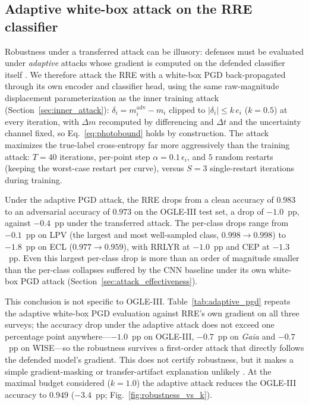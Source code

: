 \documentclass{aa}
\begin{document}
\subsection{Adaptive white-box attack on the RRE classifier}
\label{sec:adaptive_attack}


Robustness under a transferred attack can be illusory: defenses must be
evaluated under \emph{adaptive} attacks whose gradient is computed on the
defended classifier itself \citep{carlini2019evaluating}. We therefore
attack the RRE with a white-box PGD back-propagated through its own
encoder and classifier head, using the same raw-magnitude displacement
parameterization as the inner training attack
(Section~\ref{sec:inner_attack}): $\delta_i = m^{\mathrm{adv}}_i - m_i$
clipped to $|\delta_i| \le k\,e_i$ ($k=0.5$) at every iteration, with
$\Delta m$ recomputed by differencing and $\Delta t$ and the uncertainty
channel fixed, so Eq.~\eqref{eq:photobound} holds by construction. The
attack maximizes the true-label cross-entropy far more aggressively than
the training attack: $T = 40$ iterations, per-point step
$\alpha = 0.1\,\epsilon_i$, and $5$ random restarts (keeping the
worst-case restart per curve), versus $S = 3$ single-restart iterations
during training.

Under the adaptive PGD attack, the RRE drops from a
clean accuracy of $0.983$ to an adversarial accuracy of $0.973$ on the
OGLE-III test set, a drop of
$-1.0$~pp, against $-0.4$~pp under the transferred attack. The per-class
drops range from $-0.1$~pp on LPV (the largest
and most well-sampled class, $0.998 \to 0.998$) to $-1.8$~pp on ECL
($0.977 \to 0.959$), with RRLYR at $-1.0$~pp and CEP at $-1.3$~pp. Even
this largest
per-class drop is more than an order of magnitude
smaller than the per-class collapses suffered by the CNN baseline
under its own white-box PGD attack
(Section~\ref{sec:attack_effectiveness}).

This conclusion is not specific to OGLE-III. Table~\ref{tab:adaptive_pgd} repeats the adaptive white-box PGD evaluation against RRE's own gradient on all three surveys; the accuracy drop under the adaptive attack does not exceed one percentage point anywhere---$-1.0$~pp on OGLE-III, $-0.7$~pp on \textit{Gaia} and $-0.7$~pp on WISE---so the robustness survives a first-order attack that directly follows the defended model's gradient. This does not certify robustness, but it makes a simple gradient-masking or transfer-artifact explanation unlikely \citep{athalye2018obfuscated,carlini2019evaluating}. At the maximal budget considered ($k=1.0$) the adaptive attack reduces the OGLE-III accuracy to $0.949$ ($-3.4$~pp; Fig.~\ref{fig:robustness_vs_k}).
\end{document}
